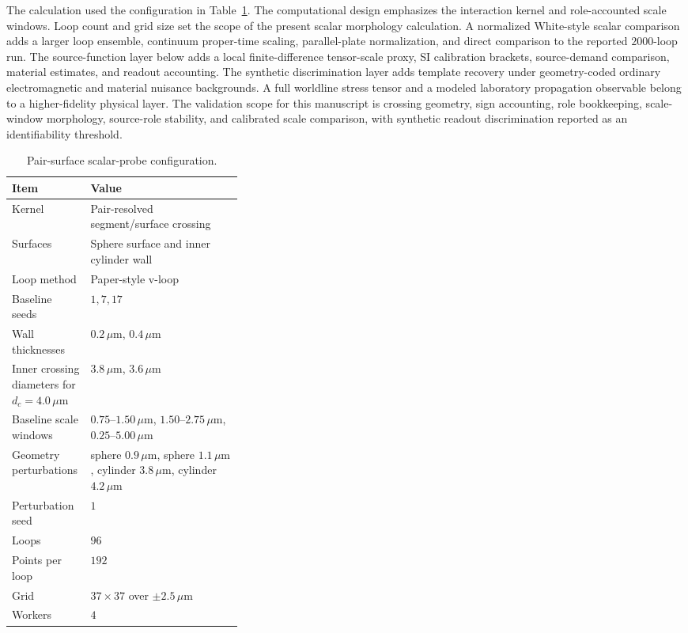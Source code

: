 \documentclass[11pt]{article}
\newcommand{\um}{\,\mu\mathrm{m}}
\begin{document}
The calculation used the configuration in Table~\ref{tab:config}. The
computational design emphasizes the interaction kernel and role-accounted scale
windows. Loop count and grid size set the scope of the present scalar
morphology calculation. A normalized White-style scalar comparison adds a larger
loop ensemble, continuum proper-time scaling, parallel-plate normalization, and
direct comparison to the reported $2000$-loop run. The source-function layer
below adds a local finite-difference tensor-scale proxy, SI calibration
brackets, source-demand comparison, material estimates, and readout accounting.
The synthetic discrimination layer adds template recovery under geometry-coded
ordinary electromagnetic and material nuisance backgrounds.
A full worldline stress tensor and a modeled laboratory propagation observable
belong to a higher-fidelity physical layer.
The validation scope for this manuscript is crossing geometry, sign accounting,
role bookkeeping, scale-window morphology, source-role stability, and calibrated
scale comparison, with synthetic readout discrimination reported as an
identifiability threshold.

\begin{table}[htbp]
\centering
\caption{Pair-surface scalar-probe configuration.}
\label{tab:config}
\begin{tabularx}{\linewidth}{>{\raggedright\arraybackslash}p{0.34\linewidth}X}
\toprule
Item & Value \\
\midrule
Kernel & Pair-resolved segment/surface crossing \\
Surfaces & Sphere surface and inner cylinder wall \\
Loop method & Paper-style v-loop \\
Baseline seeds & $1,7,17$ \\
Wall thicknesses & $0.2\um$, $0.4\um$ \\
Inner crossing diameters for $d_c=4.0\um$ & $3.8\um$, $3.6\um$ \\
Baseline scale windows & $0.75$--$1.50\um$, $1.50$--$2.75\um$, $0.25$--$5.00\um$ \\
Geometry perturbations & sphere $0.9\um$, sphere $1.1\um$, cylinder $3.8\um$, cylinder $4.2\um$ \\
Perturbation seed & $1$ \\
Loops & $96$ \\
Points per loop & $192$ \\
Grid & $37\times37$ over $\pm2.5\um$ \\
Workers & $4$ \\
\bottomrule
\end{tabularx}
\end{table}
\end{document}
